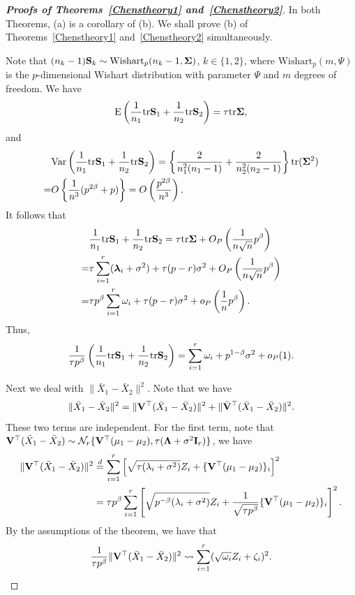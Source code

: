 \documentclass[times,sort&compress,3p]{elsarticle}
\newcommand{\mytr}{ {\rm tr} }
\newcommand{\myE}{ {\rm E} }
\newcommand{\myVar}{ {\rm Var} }
\newcommand{\bfsym}[1]{\ensuremath{\boldsymbol{#1}}}
\def\blambda {\bfsym {\lambda}}        \def\bLambda {\bfsym {\Lambda}}
\theoremstyle{plain}
\theoremstyle{definition}
\theoremstyle{remark}
\begin{document}
\begin{appendices}
\begin{proof}[\textbf{Proofs of Theorems~\ref{Chenstheory1} and~\ref{Chenstheory2}}]
    In both Theorems, (a) is a corollary of (b).
    We shall prove (b) of Theorems~\ref{Chenstheory1} and~\ref{Chenstheory2} simultaneously.
    
    Note that $(n_k-1)\BS_k\sim \text{Wishart}_p(n_k-1,\bSigma)$, $k\in \{1,2\}$,
    where $\text{Wishart}_p(m,\Psi)$ is the $p$-dimensional Wishart distribution with parameter $\Psi$ and $m$ degrees of freedom.
    We have 
    $$
 \myE\left(\frac{1}{n_1}\mytr \BS_1+\frac{1}{n_2}\mytr \BS_2\right)=\tau \mytr\bSigma,
    $$
    and
\begin{align*}
    &\myVar\left(\frac{1}{n_1}\mytr \BS_1+\frac{1}{n_2}\mytr \BS_2\right)=
    \left\{\frac{2}{n_1^2(n_1-1)}+\frac{2}{n_2^2(n_2-1)}\right\}\mytr (\bSigma^2)\\
    =&
    O\left\{\frac{1}{n^3}(p^{2\beta}+p)\right\}=O\left(\frac{p^{2\beta}}{n^3}\right).
\end{align*}
    It follows that
\begin{align*}
    &\frac{1}{n_1}\mytr \BS_1+\frac{1}{n_2}\mytr \BS_2=
\tau \mytr \bSigma+O_P\left(\frac{1}{n\sqrt{n}}p^{\beta}\right)\\
    =&\tau \sum_{i=1}^r (\blambda_i+\sigma^2)+\tau(p-r)\sigma^2+O_P\left(\frac{1}{n\sqrt{n}}p^{\beta}\right)\\
    =&\tau p^{\beta} \sum_{i=1}^r \omega_i+\tau(p-r)\sigma^2+o_P\left(\frac{1}{n}p^{\beta}\right).
\end{align*}
Thus,
\begin{equation}\label{eq:kkk1}
\frac{1}{\tau p^\beta}\left(\frac{1}{n_1}\mytr \BS_1+\frac{1}{n_2}\mytr \BS_2\right)
=\sum_{i=1}^r \omega_i+p^{1-\beta}\sigma^2+o_P(1).
\end{equation}

    Next we deal with $\|\bar{X}_1-\bar{X}_2\|^2$.
    Note that we have
    $$
    \|\bar{X}_1-\bar{X}_2\|^2=
    \|\mathbf{V}^\top (\bar{X}_1-\bar{X}_2)\|^2+
    \|\tilde{\mathbf{V}}^\top (\bar{X}_1-\bar{X}_2)\|^2.
    $$
    These two terms are independent.
For the first term, note that $\BV^\top (\bar{X}_1-\bar{X}_2)\sim \mathcal{N}_r \{\BV^\top  (\mu_1-\mu_2),\tau (\bLambda+\sigma^2 \BI_r) \}$, we have
\begin{align*}
    \|\mathbf{V}^\top (\bar{X}_1-\bar{X}_2)\|^2&\overset{d}{=}
    \sum_{i=1}^r \left[\sqrt{\tau (\lambda_i+\sigma^2)}Z_i+\{\mathbf{V}^\top  (\mu_1-\mu_2)\}_i \right]^2\\
    &=\tau p^{\beta}
    \sum_{i=1}^r
    \left[ \sqrt{p^{-\beta}(\lambda_i+\sigma^2)}Z_i+\frac{1}{\sqrt{\tau p^{\beta}}}\{\mathbf{V}^\top  (\mu_1-\mu_2)\}_i \right]^2.
\end{align*}
    By the assumptions of the theorem,  we have that
    \begin{equation}\label{eq:kkk2}
        \frac{1}{\tau p^{\beta}}\|\mathbf{V}^\top (\bar{X}_1-\bar{X}_2)\|^2
        \rightsquigarrow
        \sum_{i=1}^r (\sqrt{\omega_i} Z_i+\zeta_i )^2.
    \end{equation}


\end{proof}
\end{appendices}
\end{document}
